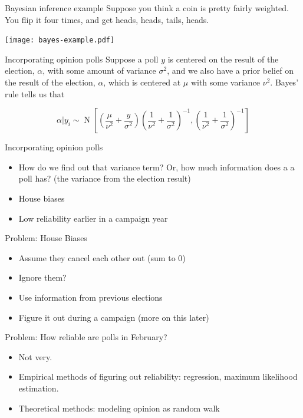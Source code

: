 \documentclass[14pt, t]{beamer}
\DeclareMathOperator{\N}{N}
\begin{document}
\begin{frame}{Bayesian inference example}
Suppose you think a coin is pretty fairly weighted. You flip it four times, and get heads, heads, tails, heads.
\begin{center}
\texttt{[image: bayes-example.pdf]}
\end{center}
\end{frame}

\begin{frame}{Incorporating opinion polls}
Suppose a poll \(y\) is centered on the result of the election, \(\alpha\), with some amount of variance \(\sigma^2\), and we also have a prior belief on the result of the election, \(\alpha\), which is centered at \(\mu\) with some variance \(\nu^2\). Bayes' rule tells us that
\begin{center}
 \[
		\alpha | y_i \sim \N\left[\left(\frac{\mu}{\nu^2} + \frac{y}{\sigma^2}\right)\left(\frac{1}{\nu^2} + \frac{1}{\sigma^2}\right)^{-1}, \left(\frac{1}{\nu^2} + \frac{1}{\sigma^2}\right)^{-1} \right]
	\]
\end{center}
\end{frame}

\begin{frame}{Incorporating opinion polls}
\begin{itemize}
	\item How do we find out that variance term? Or, how much information does a a poll has? (the variance from the election result)
	\item House biases
	\item Low reliability earlier in a campaign year
\end{itemize}
\end{frame}

\begin{frame}{Problem: House Biases}
\begin{itemize}
	\item Assume they cancel each other out (sum to 0)
	\item Ignore them?
	\item Use information from previous elections
	\item Figure it out during a campaign (more on this later)
\end{itemize}
\end{frame}

\begin{frame}{Problem: How reliable are polls in February?}
\begin{itemize}
	\item Not very.
	\item Empirical methods of figuring out reliability: regression, maximum likelihood estimation.
	\item Theoretical methods: modeling opinion as random walk
\end{itemize}
\end{frame}
\end{document}
